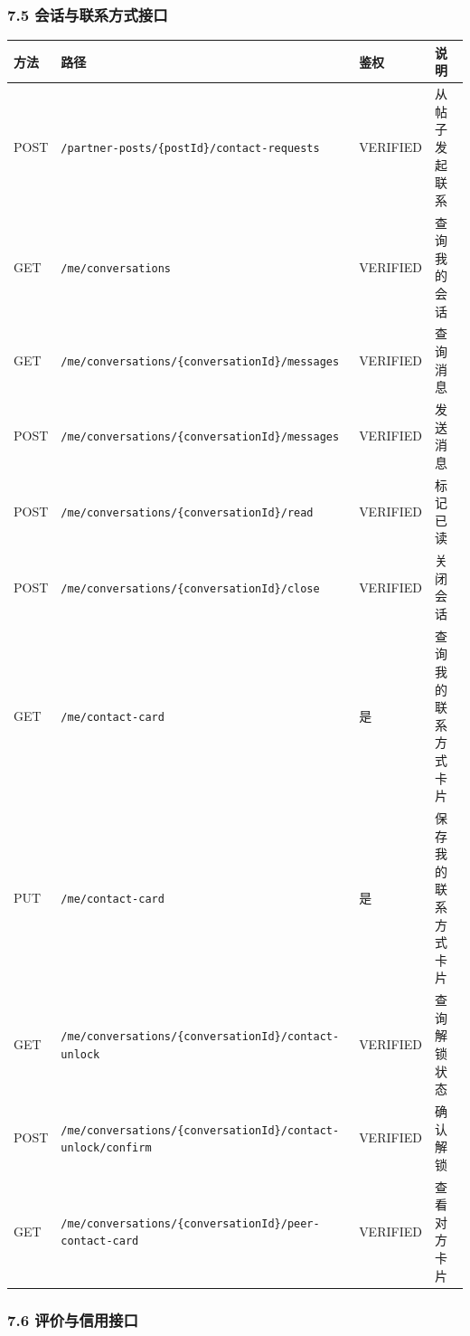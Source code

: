 \documentclass[
]{ctexart}
\begin{document}
\hypertarget{ux4f1aux8bddux4e0eux8054ux7cfbux65b9ux5f0fux63a5ux53e3}{%
\subsubsection{7.5
会话与联系方式接口}\label{ux4f1aux8bddux4e0eux8054ux7cfbux65b9ux5f0fux63a5ux53e3}}

\begin{longtable}[]{@{}
  >{\raggedright\arraybackslash}p{}
  >{\raggedright\arraybackslash}p{}
  >{\raggedright\arraybackslash}p{}
  >{\raggedright\arraybackslash}p{}@{}}
\toprule
方法 & 路径 & 鉴权 & 说明 \\
\midrule
\endhead
POST & \texttt{/partner-posts/\{postId\}/contact-requests} & VERIFIED &
从帖子发起联系 \\
GET & \texttt{/me/conversations} & VERIFIED & 查询我的会话 \\
GET & \texttt{/me/conversations/\{conversationId\}/messages} & VERIFIED
& 查询消息 \\
POST & \texttt{/me/conversations/\{conversationId\}/messages} & VERIFIED
& 发送消息 \\
POST & \texttt{/me/conversations/\{conversationId\}/read} & VERIFIED &
标记已读 \\
POST & \texttt{/me/conversations/\{conversationId\}/close} & VERIFIED &
关闭会话 \\
GET & \texttt{/me/contact-card} & 是 & 查询我的联系方式卡片 \\
PUT & \texttt{/me/contact-card} & 是 & 保存我的联系方式卡片 \\
GET & \texttt{/me/conversations/\{conversationId\}/contact-unlock} &
VERIFIED & 查询解锁状态 \\
POST &
\texttt{/me/conversations/\{conversationId\}/contact-unlock/confirm} &
VERIFIED & 确认解锁 \\
GET & \texttt{/me/conversations/\{conversationId\}/peer-contact-card} &
VERIFIED & 查看对方卡片 \\
\bottomrule
\end{longtable}

\hypertarget{ux8bc4ux4ef7ux4e0eux4fe1ux7528ux63a5ux53e3}{%
\subsubsection{7.6
评价与信用接口}\label{ux8bc4ux4ef7ux4e0eux4fe1ux7528ux63a5ux53e3}}
\end{document}
